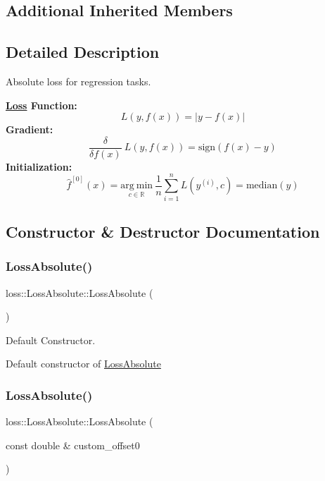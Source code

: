 \subsection*{Additional Inherited Members}


\subsection{Detailed Description}
Absolute loss for regression tasks. 

{\bfseries \mbox{\hyperlink{classloss_1_1_loss}{Loss}} Function\+:} \[ L(y, f(x)) = \left| y - f(x) \right| \] {\bfseries Gradient\+:} \[ \frac{\delta}{\delta f(x)}\ L(y, f(x)) = \mathrm{sign}\left( f(x) - y \right) \] {\bfseries Initialization\+:} \[ \hat{f}^{[0]}(x) = \underset{c\in\mathbb{R}}{\mathrm{arg~min}}\ \frac{1}{n}\sum\limits_{i=1}^n L\left(y^{(i)}, c\right) = \mathrm{median}(y) \] 

\subsection{Constructor \& Destructor Documentation}
\mbox{\label{classloss_1_1_loss_absolute_a7da079d5e12d8970854d10f787fa9602}} 
\subsubsection{\texorpdfstring{Loss\+Absolute()}{LossAbsolute()}\hspace{0.1cm}{\footnotesize\ttfamily [1/2]}}
{\footnotesize\ttfamily loss\+::\+Loss\+Absolute\+::\+Loss\+Absolute (\begin{DoxyParamCaption}{ }\end{DoxyParamCaption})}



Default Constructor. 

Default constructor of {\ttfamily \mbox{\hyperlink{classloss_1_1_loss_absolute}{Loss\+Absolute}}} \mbox{\label{classloss_1_1_loss_absolute_a5b4faa92b976121bcc5cb6938015ac36}} 
\subsubsection{\texorpdfstring{Loss\+Absolute()}{LossAbsolute()}\hspace{0.1cm}{\footnotesize\ttfamily [2/2]}}
{\footnotesize\ttfamily loss\+::\+Loss\+Absolute\+::\+Loss\+Absolute (\begin{DoxyParamCaption}\item[{const double \&}]{custom\+\_\+offset0 }\end{DoxyParamCaption})}



